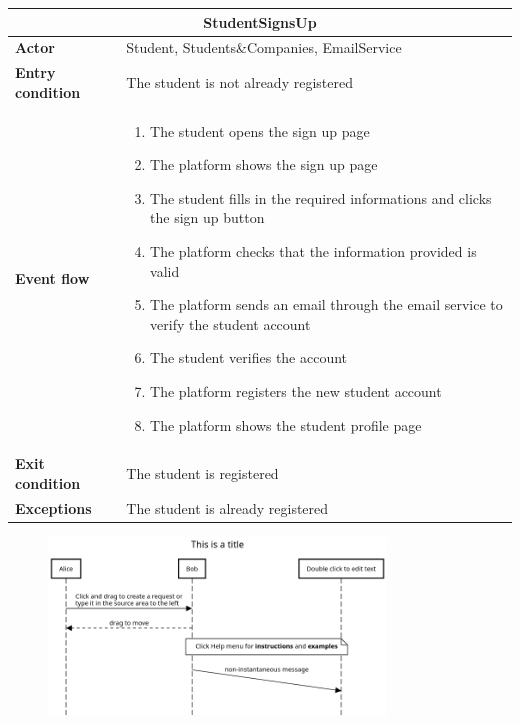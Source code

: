 \begin{table}[H]
    \centering
    \begin{tabular}{|l|m{10cm}|}
        \hline \multicolumn{2}{|c|}{\textbf{StudentSignsUp}} \\
        \hline \textbf{Actor} & Student, Students\&Companies, EmailService \\
        \hline \textbf{Entry condition} & The student is not already registered \\
        \hline \textbf{Event flow} &
            \begin{enumerate}
                \item The student opens the sign up page
                \item The platform shows the sign up page
                \item The student fills in the required informations and clicks the sign up button
                \item The platform checks that the information provided is valid
                \item The platform sends an email through the email service to verify the student account
                \item The student verifies the account
                \item The platform registers the new student account
                \item The platform shows the student profile page
            \end{enumerate} \\
        \hline \textbf{Exit condition} & The student is registered \\
        \hline \textbf{Exceptions} & The student is already registered \\
        \hline
    \end{tabular}
\end{table}

\begin{figure}[H]
    \centering
    \includegraphics[width=0.8\textwidth]{../../assets/sequence-diagrams/StudentsSignsUp.png}
\end{figure}

